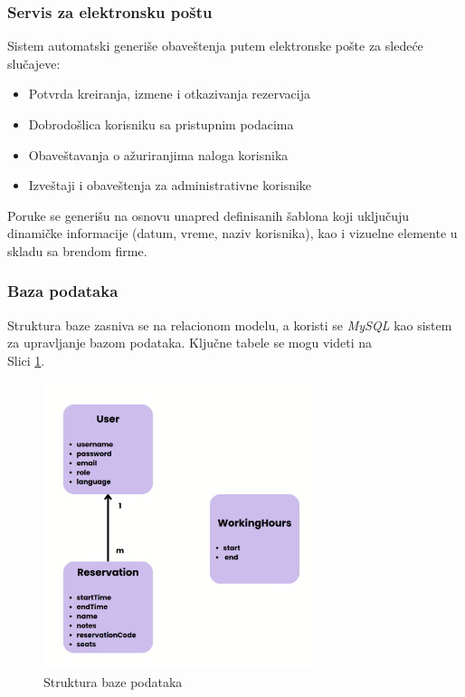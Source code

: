 \documentclass[12pt]{article}
\begin{document}
    \subsubsection{Servis za elektronsku poštu}

    Sistem automatski generiše obaveštenja putem elektronske pošte za sledeće slučajeve:
    \begin{itemize}
    \item Potvrda kreiranja, izmene i otkazivanja rezervacija
    \item Dobrodošlica korisniku sa pristupnim podacima
    \item Obaveštavanja o ažuriranjima naloga korisnika
    \item Izveštaji i obaveštenja za administrativne korisnike
    \end{itemize}

    Poruke se generišu na osnovu unapred definisanih šablona koji uključuju dinamičke 
    informacije (datum, vreme, naziv korisnika), kao i vizuelne elemente u skladu sa brendom firme.

    \newpage
    \subsubsection{Baza podataka}

    Struktura baze zasniva se na relacionom modelu, a koristi se \textit{MySQL} kao sistem za upravljanje 
    bazom podataka. Ključne tabele se mogu videti na \\ Slici \ref{fig:baza_struktura}.

    \begin{figure}[h!]
        \vspace{0.5cm}
        \centering
        \includegraphics[width=0.7\textwidth]{db.png}
        \caption{Struktura baze podataka}
        \label{fig:baza_struktura}
    \end{figure}
\end{document}
